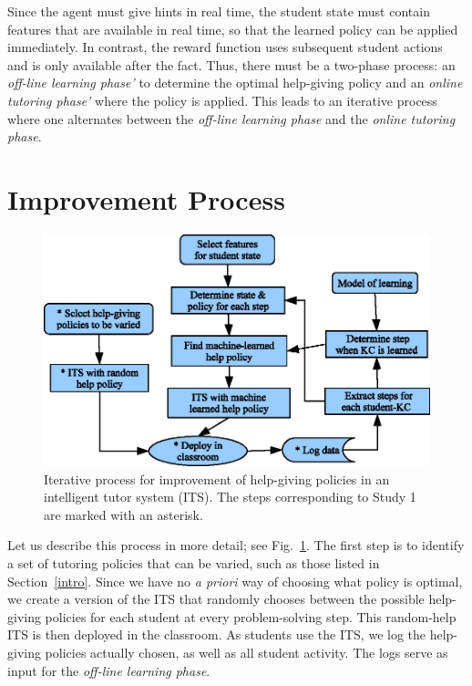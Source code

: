 \documentclass{edm_template}
\begin{document}
Since the agent must give hints in real time, the student state
must contain features that are available in real time, so that
the learned policy can be applied immediately.  In contrast,
the reward function uses subsequent student actions and is only
available after the fact.  Thus, there must be a two-phase process:
an {\em off-line learning phase'} to determine the optimal help-giving 
policy and an {\em online tutoring phase'} where the policy is applied.
This leads to an iterative process where one alternates between 
the {\em off-line learning phase} and the {\em online tutoring phase}.

\section{Improvement Process}
%
%
%
\begin{figure}
\centering    \includegraphics{process.eps}
\caption{Iterative process for improvement of help-giving policies in
  an intelligent  tutor system (ITS).  The steps corresponding to Study 1 are marked
  with an asterisk.} \label{process}
\end{figure}

\label{improvement}

Let us describe this process in more detail; see Fig.~\ref{process}.  The first
step is to identify a set of tutoring policies that can be varied,
such as those listed in Section~\ref{intro}.  Since we have no {\em a priori}
way of choosing what policy is optimal, we create a version of the ITS
that randomly chooses between the possible help-giving policies for each student
at every problem-solving step.  This random-help ITS is then deployed
in the classroom.  As students use the ITS, we log the help-giving policies actually chosen, as well
as all student activity.  The logs serve as input for the
{\em off-line learning phase}.
\end{document}
